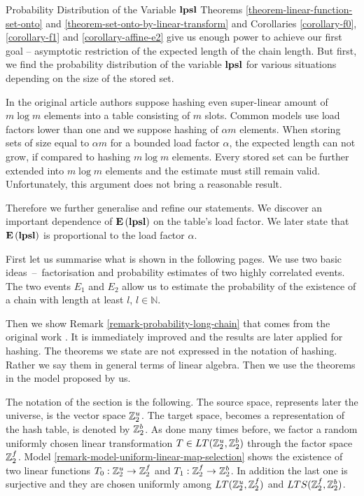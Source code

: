 \begin{section}{Probability Distribution of the Variable \texorpdfstring{$\mathbf{lpsl}$}{lpsl}}
\label{section-linear-transformations-distribution}
Theorems \ref{theorem-linear-function-set-onto} and \ref{theorem-set-onto-by-linear-transform} and Corollaries \ref{corollary-f0}, \ref{corollary-f1} and \ref{corollary-affine-e2} give us enough power to achieve our first goal -- asymptotic restriction of the expected length of the chain length. But first, we find the probability distribution of the variable $\mathbf{lpsl}$ for various situations depending on the size of the stored set. 

In the original article \cite{DBLP:journals/jacm/AlonDMPT99} authors suppose hashing even super-linear amount of $m \log m$ elements into a table consisting of $m$ slots. Common models use load factors lower than one and we suppose hashing of $\alpha m$ elements. When storing sets of size equal to $\alpha m$ for a bounded load factor $\alpha$, the expected length can not grow, if compared to hashing $m \log m$ elements. Every stored set can be further extended into $m \log m$ elements and the estimate must still remain valid. Unfortunately, this argument does not bring a reasonable result.

Therefore we further generalise and refine our statements. We discover an important dependence of $\mathbf{E}\left(\mathbf{lpsl}\right)$ on the table's load factor. We later state that $\mathbf{E}\left(\mathbf{lpsl}\right)$ is proportional to the load factor $\alpha$.

First let us summarise what is shown in the following pages. We use two basic ideas~--~factorisation and probability estimates of two highly correlated events. The two events $E_1$ and $E_2$ allow us to estimate the probability of the existence of a chain with length at least $l$, $l \in \mathbb{N}$. 

Then we show Remark \ref{remark-probability-long-chain} that comes from the original work \cite{DBLP:journals/jacm/AlonDMPT99}. It is immediately improved and the results are later applied for hashing. The theorems we state are not expressed in the notation of hashing. Rather we say them in general terms of linear algebra. Then we use the theorems in the model proposed by us. 

The notation of the section is the following. The source space, represents later the universe, is the vector space $\mathbb{Z}_{2}^{u}$. The target space, becomes a representation of the hash table, is denoted by $\mathbb{Z}_{2}^{b}$. As done many times before, we factor a random uniformly chosen linear transformation $T \in LT(\mathbb{Z}_{2}^{u}, \mathbb{Z}_{2}^{b})$ through the factor space $\mathbb{Z}_{2}^{f}$. Model \ref{remark-model-uniform-linear-map-selection} shows the existence of two linear functions $T_0: \mathbb{Z}_{2}^{u} \rightarrow \mathbb{Z}_{2}^{f}$ and $T_1: \mathbb{Z}_{2}^{f} \rightarrow \mathbb{Z}_{2}^{b}$. In addition the last one is surjective and they are chosen uniformly among $LT(\mathbb{Z}_{2}^{u}, \mathbb{Z}_{2}^{f})$ and $LTS(\mathbb{Z}_{2}^{f}, \mathbb{Z}_{2}^{b})$.


\end{section}
